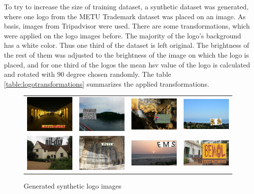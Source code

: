 To try to increase the size of training dataset, a synthetic dataset was generated, where one logo from the METU Trademark dataset \cite{DBLP:journals/corr/TursunAK17} was placed on an image. As basis, images from Tripadvisor were used. There are some transformations, which were applied on the logo images before. The majority of the logo's background has a white color. Thus one third of the dataset is left original. The brightness of the rest of them was adjusted to the brightness of the image on which the logo is placed, and for one third of the logos the mean hsv value of the logo is calculated and rotated with 90 degree chosen randomly. The table \ref{table:logotransformations} summarizes the applied transformations.

\begin{figure}
  \centering
\begin{tabular}{cccc}
  \includegraphics[width=25mm]{images/mt/synmetu1.jpg} &   \includegraphics[width=25mm]{images/mt/synmetu2.jpg}  & \includegraphics[width=25mm]{images/mt/synmetu3.jpg} &   \includegraphics[width=25mm]{images/mt/synmetu4.jpg} \\
    \includegraphics[width=25mm]{images/mt/synmetu5.jpg} &   \includegraphics[width=25mm]{images/mt/synmetu6.jpg}  & \includegraphics[width=25mm]{images/mt/synmetu7.jpg} &   \includegraphics[width=25mm]{images/mt/synmetu8.jpg} 
\end{tabular}
\caption{Generated synthetic logo images}
\end{figure}


